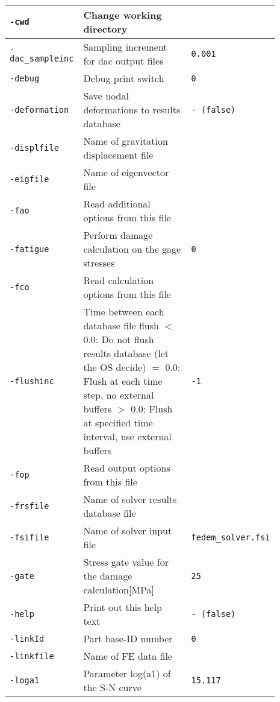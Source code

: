 \begin{threeparttable}[b]
\begin{tabular}{|>{\raggedright} p{0.23\linewidth}| p{0.48\linewidth}| p{0.18\linewidth}|}
  \texttt{-cwd} &   Change working directory &  \\
  \hline
  \texttt{-dac\_sampleinc} &    Sampling increment for dac output files & \texttt{0.001}   \\
  \hline
  \texttt{-debug} &    Debug print switch & \texttt{0}   \\
  \hline
  \texttt{-deformation} &    Save nodal deformations to results database  & \texttt{- (false)}   \\
  \hline
  \texttt{-displfile} &    Name of gravitation displacement file &  \\
  \hline
  \texttt{-eigfile} &    Name of eigenvector file &  \\
  \hline
  \texttt{-fao} &    Read additional options from this file &  \\
  \hline
  \texttt{-fatigue} &    Perform damage calculation on the gage stresses  & \texttt{0}   \\
  \hline
  \texttt{-fco} &       Read calculation options from this file &  \\
  \hline
  \texttt{-flushinc} &    Time between each database file flush\newline
                          $<$ 0.0: Do not flush results database (let the OS decide)\newline
                          $=$ 0.0: Flush at each time step, no external buffers\newline
                          $>$ 0.0: Flush at specified time interval, use external buffers  & \texttt{-1}   \\
  \hline
  \texttt{-fop} &    Read output options from this file &  \\
  \hline
  \texttt{-frsfile} &    Name of solver results database file &  \\
  \hline
  \texttt{-fsifile} &    Name of solver input file  & \scriptsize{\texttt{fedem\_solver.fsi}}   \\
  \hline
  \texttt{-gate} &    Stress gate value for the damage calculation[MPa]  & \texttt{25}   \\
  \hline
  \texttt{-help} &    Print out this help text  & \texttt{- (false)}   \\
  \hline
  \texttt{-linkId} &    Part base-ID number  & \texttt{0}   \\
  \hline
  \texttt{-linkfile} &    Name of FE data file &  \\
  \hline
  \texttt{-loga1} &    Parameter log(a1) of the S-N curve  & \texttt{15.117}   \\

\end{tabular}
\end{threeparttable}
